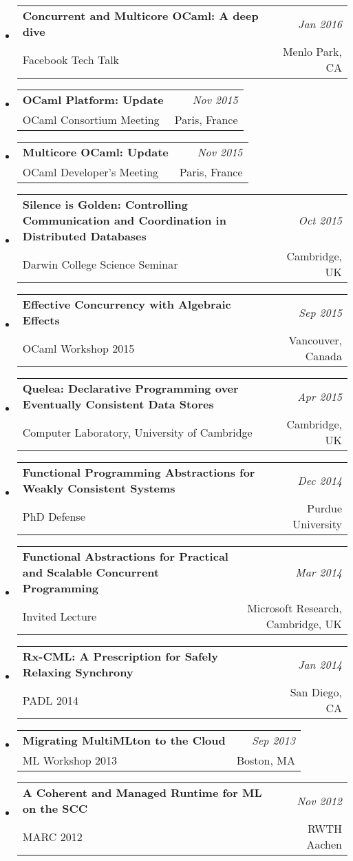\documentclass[10pt]{article}
\makeatletter
\newcommand{\lbar}[1]{{\color{#1}\ding{118}}\hspace*{2pt}}
\newenvironment{talk}[4]
{ \item
  \begin{tabular*}{7.5in}{l@{\extracolsep{\fill}}r}
    \textbf{#1} & \textit{#2} \\
    \hspace{1ex} #3 & \small{#4}
\end{tabular*}
} {}
\newenvironment{itemregion}[1]{
  \vspace*{0.5ex}
  {\scalebox{1.4}{\textbf{#1}}}
  \begin{itemize}\itemsep1pt}
  {\end{itemize}\vspace{0.8ex}}
\makeatother
\begin{document}
\begin{itemregion}{\lbar{blue}Talks}
  \begin{talk} {Concurrent and Multicore OCaml: A deep dive}
    {Jan 2016} {Facebook Tech Talk} {Menlo Park, CA}
  \end{talk}

  \begin{talk} {OCaml Platform: Update}
    {Nov 2015}{OCaml Consortium Meeting}{Paris, France}
  \end{talk}

  \begin{talk} {Multicore OCaml: Update}
    {Nov 2015}{OCaml Developer's Meeting}{Paris, France}
  \end{talk}

  \begin{talk} {Silence is Golden: Controlling Communication and Coordination in Distributed Databases}
    {Oct 2015}{Darwin College Science Seminar}{Cambridge, UK}
  \end{talk}

  \begin{talk} {Effective Concurrency with Algebraic Effects}
    {Sep 2015}{OCaml Workshop 2015}{Vancouver, Canada}
  \end{talk}

  \begin{talk} {Quelea: Declarative Programming over Eventually Consistent Data Stores}
    {Apr 2015}{Computer Laboratory, University of Cambridge} {Cambridge, UK}
  \end{talk}

  \begin{talk} {Functional Programming Abstractions for Weakly Consistent Systems}
    {Dec 2014}{PhD Defense}{Purdue University}
  \end{talk}

  \begin{talk} {Functional Abstractions for Practical and Scalable Concurrent Programming}
    {Mar 2014}{Invited Lecture}{Microsoft Research, Cambridge, UK}
  \end{talk}

  \begin{talk}{Rx-CML: A Prescription for Safely Relaxing Synchrony}
    {Jan 2014}{PADL 2014}{San Diego, CA}
  \end{talk}

  \begin{talk}{Migrating MultiMLton to the Cloud}
    {Sep 2013}{ML Workshop 2013}{Boston, MA}
  \end{talk}

  \begin{talk}{A Coherent and Managed Runtime for ML on the SCC}
    {Nov 2012}{MARC 2012}{RWTH Aachen}
  \end{talk}


\end{itemregion}
\end{document}
